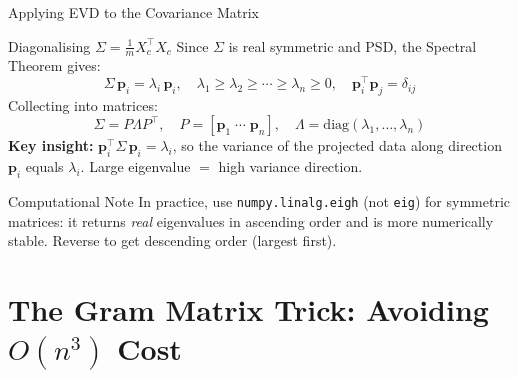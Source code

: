 \documentclass{beamer}
\begin{document}
\begin{frame}[shrink=10]{Applying EVD to the Covariance Matrix}
  \begin{block}{Diagonalising $\Sigma = \frac{1}{m}X_c^\top X_c$}
    Since $\Sigma$ is real symmetric and PSD, the Spectral Theorem gives:
    \[
      \Sigma\,\mathbf{p}_i = \lambda_i\,\mathbf{p}_i,
      \quad
      \lambda_1 \geq \lambda_2 \geq \cdots \geq \lambda_n \geq 0,
      \quad
      \mathbf{p}_i^\top\mathbf{p}_j = \delta_{ij}
    \]
    Collecting into matrices:
    \[
      \Sigma = P\Lambda P^\top,
      \quad
      P = [\mathbf{p}_1 \;\cdots\; \mathbf{p}_n],
      \quad
      \Lambda = \mathrm{diag}(\lambda_1,\ldots,\lambda_n)
    \]
    \textbf{Key insight:} $\mathbf{p}_i^\top \Sigma\, \mathbf{p}_i = \lambda_i$,
    so the variance of the projected data along direction $\mathbf{p}_i$
    equals $\lambda_i$. Large eigenvalue $=$ high variance direction.
  \end{block}

  \begin{alertblock}{Computational Note}
    In practice, use \texttt{numpy.linalg.eigh} (not \texttt{eig}) for
    symmetric matrices: it returns \emph{real} eigenvalues in ascending
    order and is more numerically stable.
    Reverse to get descending order (largest first).
  \end{alertblock}
\end{frame}

\section{The Gram Matrix Trick: Avoiding $O(n^3)$ Cost}
\end{document}
